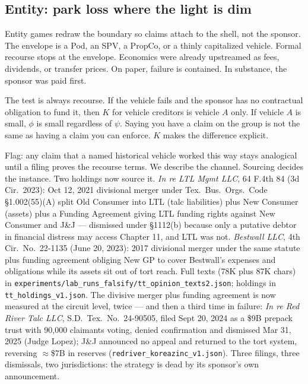 \documentclass[11pt]{article}
\begin{document}
\subsection{Entity: park loss where the light is dim}

Entity games redraw the boundary so claims attach to the shell, not the sponsor. The envelope is a Pod, an SPV, a PropCo, or a thinly capitalized vehicle. Formal recourse stops at the envelope. Economics were already upstreamed as fees, dividends, or transfer prices. On paper, failure is contained. In substance, the sponsor was paid first.

The test is always recourse. If the vehicle fails and the sponsor has no contractual obligation to fund it, then $K$ for vehicle creditors is vehicle $A$ only. If vehicle $A$ is small, $\phi$ is small regardless of $\psi$. Saying you have a claim on the group is not the same as having a claim you can enforce. $K$ makes the difference explicit.

Flag: any claim that a named historical vehicle worked this way stays analogical until a filing proves the recourse terms. We describe the channel. Sourcing decides the instance. Two holdings now source it. \textit{In re LTL Mgmt LLC}, 64 F.4th 84 (3d Cir.\ 2023): Oct 12, 2021 divisional merger under Tex.\ Bus.\ Orgs.\ Code \S1.002(55)(A) split Old Consumer into LTL (talc liabilities) plus New Consumer (assets) plus a Funding Agreement giving LTL funding rights against New Consumer and J\&J --- dismissed under \S1112(b) because only a putative debtor in financial distress may access Chapter 11, and LTL was not. \textit{Bestwall LLC}, 4th Cir.\ No.\ 22-1135 (June 20, 2023): 2017 divisional merger under the same statute plus funding agreement obliging New GP to cover Bestwall's expenses and obligations while its assets sit out of tort reach. Full texts (78K plus 87K chars) in \texttt{experiments/lab\_runs\_falsify/tt\_opinion\_texts2.json}; holdings in \texttt{tt\_holdings\_v1.json}. The divisive merger plus funding agreement is now measured at the circuit level, twice --- and then a third time in failure: \textit{In re Red River Talc LLC}, S.D.\ Tex.\ No.\ 24-90505, filed Sept 20, 2024 as a \$9B prepack trust with 90,000 claimants voting, denied confirmation and dismissed Mar 31, 2025 (Judge Lopez); J\&J announced no appeal and returned to the tort system, reversing $\approx$\$7B in reserves (\texttt{redriver\_koreazinc\_v1.json}). Three filings, three dismissals, two jurisdictions: the strategy is dead by its sponsor's own announcement.
\end{document}
